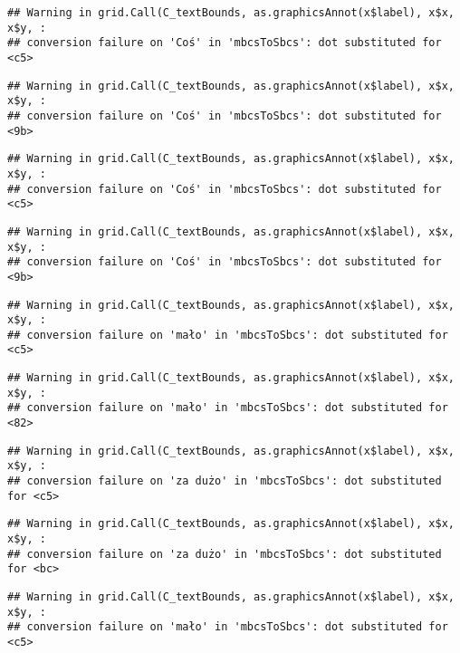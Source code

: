 \documentclass[
]{book}
\begin{document}
\begin{verbatim}
## Warning in grid.Call(C_textBounds, as.graphicsAnnot(x$label), x$x, x$y, :
## conversion failure on 'Coś' in 'mbcsToSbcs': dot substituted for <c5>
\end{verbatim}

\begin{verbatim}
## Warning in grid.Call(C_textBounds, as.graphicsAnnot(x$label), x$x, x$y, :
## conversion failure on 'Coś' in 'mbcsToSbcs': dot substituted for <9b>
\end{verbatim}

\begin{verbatim}
## Warning in grid.Call(C_textBounds, as.graphicsAnnot(x$label), x$x, x$y, :
## conversion failure on 'Coś' in 'mbcsToSbcs': dot substituted for <c5>
\end{verbatim}

\begin{verbatim}
## Warning in grid.Call(C_textBounds, as.graphicsAnnot(x$label), x$x, x$y, :
## conversion failure on 'Coś' in 'mbcsToSbcs': dot substituted for <9b>
\end{verbatim}

\begin{verbatim}
## Warning in grid.Call(C_textBounds, as.graphicsAnnot(x$label), x$x, x$y, :
## conversion failure on 'mało' in 'mbcsToSbcs': dot substituted for <c5>
\end{verbatim}

\begin{verbatim}
## Warning in grid.Call(C_textBounds, as.graphicsAnnot(x$label), x$x, x$y, :
## conversion failure on 'mało' in 'mbcsToSbcs': dot substituted for <82>
\end{verbatim}

\begin{verbatim}
## Warning in grid.Call(C_textBounds, as.graphicsAnnot(x$label), x$x, x$y, :
## conversion failure on 'za dużo' in 'mbcsToSbcs': dot substituted for <c5>
\end{verbatim}

\begin{verbatim}
## Warning in grid.Call(C_textBounds, as.graphicsAnnot(x$label), x$x, x$y, :
## conversion failure on 'za dużo' in 'mbcsToSbcs': dot substituted for <bc>
\end{verbatim}

\begin{verbatim}
## Warning in grid.Call(C_textBounds, as.graphicsAnnot(x$label), x$x, x$y, :
## conversion failure on 'mało' in 'mbcsToSbcs': dot substituted for <c5>
\end{verbatim}
\end{document}
